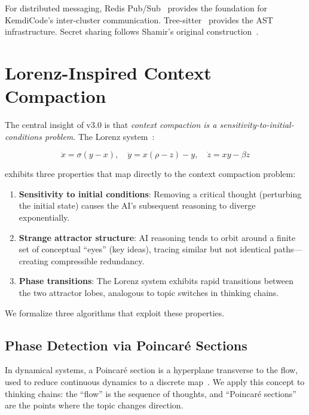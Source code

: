 \documentclass[journal,10pt]{IEEEtran}
\begin{document}
For distributed messaging, Redis Pub/Sub~\cite{redis} provides the foundation for KemdiCode's inter-cluster communication. Tree-sitter~\cite{treesitter} provides the AST infrastructure. Secret sharing follows Shamir's original construction~\cite{shamir1979}.

\section{Lorenz-Inspired Context Compaction}
\label{sec:lorenz}

The central insight of v3.0 is that \emph{context compaction is a sensitivity-to-initial-conditions problem}. The Lorenz system~\cite{lorenz1963}:

\begin{equation}
\dot{x} = \sigma(y - x), \quad \dot{y} = x(\rho - z) - y, \quad \dot{z} = xy - \beta z
\label{eq:lorenz}
\end{equation}

\noindent exhibits three properties that map directly to the context compaction problem:

\begin{enumerate}[nosep]
\item \textbf{Sensitivity to initial conditions}: Removing a critical thought (perturbing the initial state) causes the AI's subsequent reasoning to diverge exponentially.
\item \textbf{Strange attractor structure}: AI reasoning tends to orbit around a finite set of conceptual ``eyes'' (key ideas), tracing similar but not identical paths---creating compressible redundancy.
\item \textbf{Phase transitions}: The Lorenz system exhibits rapid transitions between the two attractor lobes, analogous to topic switches in thinking chains.
\end{enumerate}

We formalize three algorithms that exploit these properties.

\subsection{Phase Detection via Poincar\'{e} Sections}
\label{sec:phase}

In dynamical systems, a Poincar\'{e} section is a hyperplane transverse to the flow, used to reduce continuous dynamics to a discrete map~\cite{poincare1890}. We apply this concept to thinking chains: the ``flow'' is the sequence of thoughts, and ``Poincar\'{e} sections'' are the points where the topic changes direction.
\end{document}
